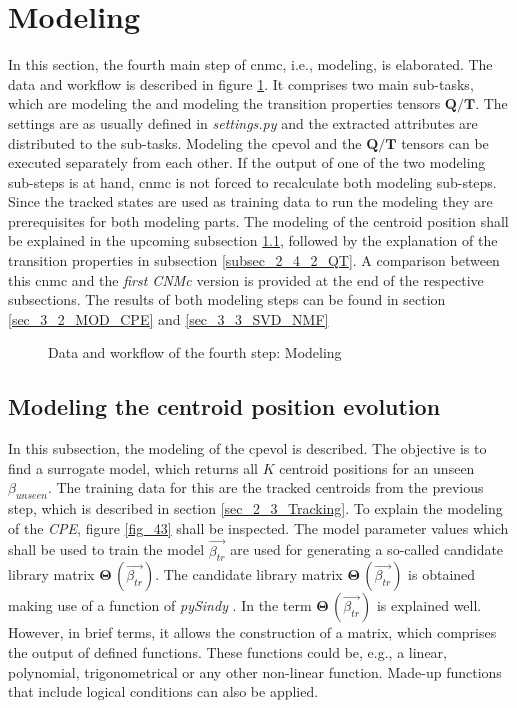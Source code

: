 \section{Modeling}
\label{sec_2_4_Modeling}
In this section, the fourth main step of \gls{cnmc}, i.e., modeling, is elaborated.
The data and workflow is described in figure \ref{fig_42}.
It comprises two main sub-tasks, which are modeling the  and modeling the transition properties tensors $\bm Q / \bm T$. 
The settings are as usually defined in \emph{settings.py} and the extracted attributes are distributed to the sub-tasks. 
Modeling the \gls{cpevol} and the $\bm Q/ \bm T$ tensors can be executed separately from each other. 
If the output of one of the two modeling sub-steps is at hand, \gls{cnmc} is not forced to recalculate both modeling sub-steps.
Since the tracked states are used as training data to run the modeling they are prerequisites for both modeling parts.
The modeling of the centroid position shall be explained in the upcoming subsection \ref{subsec_2_4_1_CPE}, followed by the explanation of the transition properties in subsection \ref{subsec_2_4_2_QT}.
A comparison between this \gls{cnmc} and the \emph{first CNMc} version is provided at the end of the respective subsections.
The results of both modeling steps can be found in section
\ref{sec_3_2_MOD_CPE} and \ref{sec_3_3_SVD_NMF}

\begin{figure} [!h]
    \hspace*{-4cm} 
    \resizebox{1.2\textwidth}{!}{
    
    }
    \caption{Data and workflow of the fourth step: Modeling}
    \label{fig_42}
\end{figure}


\subsection{Modeling the centroid position evolution}
\label{subsec_2_4_1_CPE}
In this subsection, the modeling of the \gls{cpevol} is described. 
The objective is to find a surrogate model, which returns all $K$ centroid positions for an unseen $\beta_{unseen}$. 
The training data for this are the tracked centroids from the previous step, which is described in section \ref{sec_2_3_Tracking}. 
To explain the modeling of the \emph{CPE}, figure \ref{fig_43} shall be inspected.
The model parameter values which shall be used to train the model $\vec{\beta_{tr}}$ are used for generating a so-called candidate library matrix $\boldsymbol{\Theta}\,(\vec{\beta_{tr}})$. The candidate library matrix $\boldsymbol{\Theta}\,(\vec{\beta_{tr}})$ is obtained making use of a function of \emph{pySindy} \cite{Silva2020,Kaptanoglu2022,Brunton2016}.
In \cite{Brunton2016} the term $\boldsymbol{\Theta}\,(\vec{\beta_{tr}})$ is explained well. However, in brief terms, it allows the construction of a matrix, which comprises the output of defined functions. 
These functions could be, e.g., a linear, polynomial, trigonometrical or any other non-linear function. Made-up functions that include logical conditions can also be applied. \newline 

